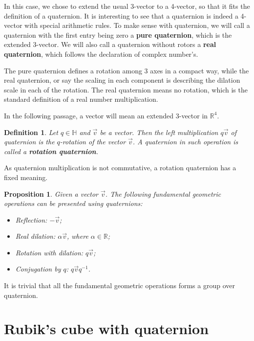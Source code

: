 \documentclass[12pt]{article}
\newtheorem*{definition}{Definition}
\newtheorem*{proposition}{Proposition}
\begin{document}
    In this case, we chose to extend the usual 3-vector to a 4-vector, so that it fits the definition of a quaternion. It is interesting to see that a quaternion is indeed a 4-vector with special arithmetic rules. To make sense with quaternion, we will call a quaternion with the first entry being zero a \textbf{pure quaternion}, which is the extended 3-vector. We will also call a quaternion without rotors a \textbf{real quaternion}, which follows the declaration of complex number's.

    The pure quaternion defines a rotation among 3 axes in a compact way, while the real quaternion, or say the scaling in each component is describing the dilation scale in each of the rotation. The real quaternion means no rotation, which is the standard definition of a real number multiplication.

    In the following passage, a vector will mean an extended 3-vector in $\mathbb{R}^4$.

    \begin{definition}
        Let $q\in\mathbb{H}$ and $\vec{v}$ be a vector. Then the left multiplication $q\vec{v}$ of quaternion is the $q$-rotation of the vector $\vec{v}$. A quaternion in such operation is called a \textbf{rotation quaternion}.
    \end{definition}

    As quaternion multiplication is not commutative, a rotation quaternion has a fixed meaning.

    \begin{proposition}
        Given a vector $\vec{v}$. The following fundamental geometric operations can be presented using quaternions:\begin{itemize}
            \item Reflection: $-\vec{v}$;
            \item Real dilation: $\alpha\vec{v}$, where $\alpha\in\mathbb{R}$;
            \item Rotation with dilation: $q\vec{v}$;
            \item Conjugation by $q$: $q\vec{v}q^{-1}$.
        \end{itemize}
    \end{proposition}

    It is trivial that all the fundamental geometric operations forms a group over quaternion.

    \section{Rubik's cube with quaternion}
\end{document}
